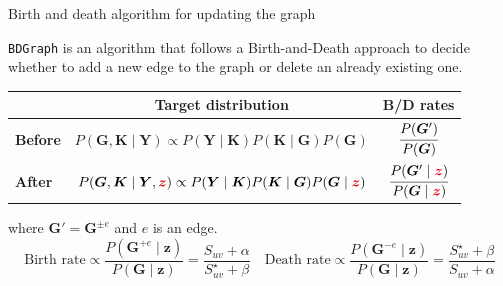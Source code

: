 \begin{frame}{Birth and death algorithm for updating the graph}

    \texttt{BDGraph} is an algorithm that follows a Birth-and-Death approach to decide whether to \alert{add} a new edge to the graph or \alert{delete} an already existing one.

    \pause
    
    \begin{table}[tb]
        \centering
        \begin{tabular}{lcc}
        \toprule
        & Target distribution & B/D rates \\
        \hline
        \textbf{Before} & $P(\bm{G},\bm{K} \mid \bm{Y}) \propto P(\bm{Y} \mid \bm{K})P (\bm{K} \mid \bm{G})P(\bm{G})$ & $\cfrac{P(\bm{G}')}{P(\bm{G})}$ \\
        \textbf{After}  & $P(\bm{G},\bm{K} \mid \bm{Y}, \textcolor{sleekRed}{\bm{z}}) \propto P(\bm{Y} \mid \bm{K})P(\bm{K} \mid \bm{G})P(\bm{G} \mid \textcolor{sleekRed}{\bm{z}})$ & $\cfrac{P(\bm{G}' \mid \textcolor{sleekRed}{\bm{z}})}{P(\bm{G} \mid \textcolor{sleekRed}{\bm{z}})}$ \\
        \bottomrule
        \end{tabular}
    \end{table}
    where $\bm{G}' = \bm{G}^{\pm e}$ and $e$ is an edge.
    \pause
    \[
        \text{Birth rate} \propto \frac{P(\bm{G}^{+ e}\mid \bm{z})}{P(\bm{G}\mid \bm{z})} = \frac{S_{uv} + \alpha}{S^{\star}_{uv} + \beta}
        \quad
        \text{Death rate} \propto \frac{P(\bm{G}^{- e}\mid \bm{z})}{P(\bm{G}\mid \bm{z})} = \frac{S^{\star}_{uv} + \beta}{S_{uv} + \alpha}
    \]
    
\end{frame}

